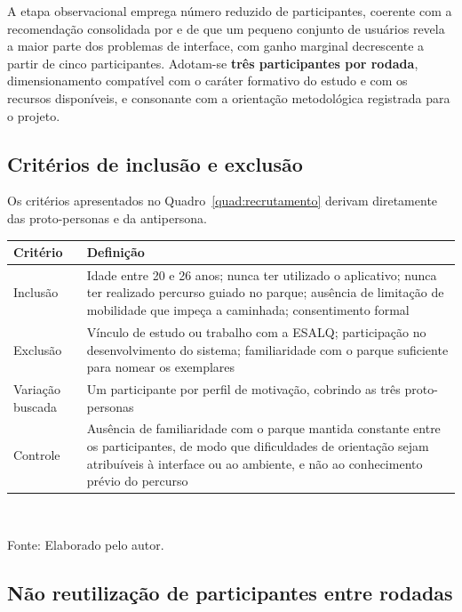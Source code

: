 A etapa observacional emprega número reduzido de participantes, coerente com a
recomendação consolidada por  e
 de que um pequeno conjunto de usuários revela a maior parte
dos problemas de interface, com ganho marginal decrescente a partir de cinco
participantes. Adotam-se \textbf{três participantes por rodada}, dimensionamento
compatível com o caráter formativo do estudo e com os recursos disponíveis, e
consonante com a orientação metodológica registrada para o projeto.

\subsection{Critérios de inclusão e exclusão}

Os critérios apresentados no Quadro~\ref{quad:recrutamento} derivam diretamente
das proto-personas e da antipersona.

\begin{quadro}[htb]
\centering
\caption{Critérios de recrutamento de participantes}
\label{quad:recrutamento}
\begin{tabular}{p{2.8cm} p{10.0cm}}
\toprule
\textbf{Critério} & \textbf{Definição} \\
\midrule
Inclusão & Idade entre 20 e 26 anos; nunca ter utilizado o aplicativo; nunca ter
realizado percurso guiado no parque; ausência de limitação de mobilidade que
impeça a caminhada; consentimento formal \\
\addlinespace
Exclusão & Vínculo de estudo ou trabalho com a ESALQ; participação no
desenvolvimento do sistema; familiaridade com o parque suficiente para nomear os
exemplares \\
\addlinespace
Variação buscada & Um participante por perfil de motivação, cobrindo as três
proto-personas \\
\addlinespace
Controle & Ausência de familiaridade com o parque mantida constante entre os
participantes, de modo que dificuldades de orientação sejam atribuíveis à
interface ou ao ambiente, e não ao conhecimento prévio do percurso \\
\bottomrule
\end{tabular}
\\[4pt]
\begin{flushleft}
Fonte: Elaborado pelo autor.
\end{flushleft}
\end{quadro}

\subsection{Não reutilização de participantes entre rodadas}

